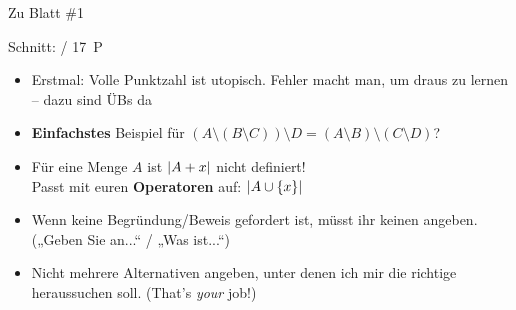 



\morescalingdelimiters




\begin{frame}{Zu Blatt \#1}
	
	Schnitt: \quad {} / 17~P
	
	\begin{itemize}[<+->]
		\item Erstmal: Volle Punktzahl ist utopisch. Fehler macht man, um draus zu lernen – dazu sind ÜBs da
		\item \textbf{Einfachstes} Beispiel für $(A \setminus (B \setminus C)) \setminus D = (A \setminus B) \setminus (C \setminus D)$? \only<beamer:0>{\\ \impl $A = B = C = D = \emptyset$.}
		\item Für eine Menge $A$ ist $\left\lvert A + x \right\rvert$ nicht definiert! \\
		Passt mit euren \textbf{Operatoren} auf: \impl $\left\lvert A \cup \left\{x\right\} \right\rvert$
		\item Wenn keine Begründung/Beweis gefordert ist, müsst ihr keinen angeben. („Geben Sie an...“ / „Was ist...“)
		\item Nicht mehrere Alternativen angeben, unter denen ich mir die richtige heraussuchen soll. (That's \emph{your} job!)
	\end{itemize}
\end{frame}

